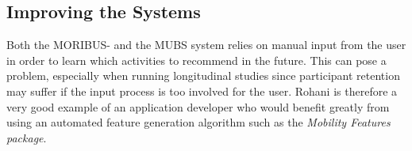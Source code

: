 \subsection{Improving the Systems}
Both the MORIBUS- and the MUBS system relies on manual input from the user in order to learn which activities to recommend in the future. This can pose a problem, especially when running longitudinal studies since participant retention may suffer if the input process is too involved for the user. Rohani is therefore a very good example of an application developer who would benefit greatly from using an automated feature generation algorithm such as the \textit{Mobility Features package}.